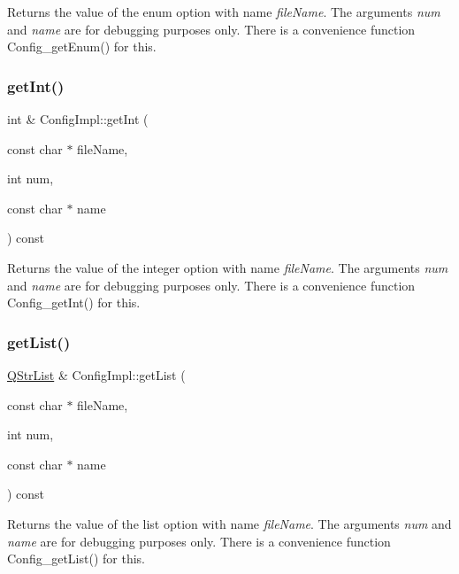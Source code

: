 Returns the value of the enum option with name {\itshape file\+Name}. The arguments {\itshape num} and {\itshape name} are for debugging purposes only. There is a convenience function Config\+\_\+get\+Enum() for this. \mbox{\label{class_config_impl_adb74a4b0533fcb0452aa355bc0f931b6}} 
\subsubsection{\texorpdfstring{getInt()}{getInt()}}
{\footnotesize\ttfamily int \& Config\+Impl\+::get\+Int (\begin{DoxyParamCaption}\item[{const char $\ast$}]{file\+Name,  }\item[{int}]{num,  }\item[{const char $\ast$}]{name }\end{DoxyParamCaption}) const}

Returns the value of the integer option with name {\itshape file\+Name}. The arguments {\itshape num} and {\itshape name} are for debugging purposes only. There is a convenience function Config\+\_\+get\+Int() for this. \mbox{\label{class_config_impl_aa4ec3b5c98e5c889150a68c028d1152c}} 
\subsubsection{\texorpdfstring{getList()}{getList()}}
{\footnotesize\ttfamily \mbox{\hyperlink{class_q_str_list}{Q\+Str\+List}} \& Config\+Impl\+::get\+List (\begin{DoxyParamCaption}\item[{const char $\ast$}]{file\+Name,  }\item[{int}]{num,  }\item[{const char $\ast$}]{name }\end{DoxyParamCaption}) const}

Returns the value of the list option with name {\itshape file\+Name}. The arguments {\itshape num} and {\itshape name} are for debugging purposes only. There is a convenience function Config\+\_\+get\+List() for this. \mbox{\label{class_config_impl_afb11a49a6e7c717d0242fedf10a36309}} 
